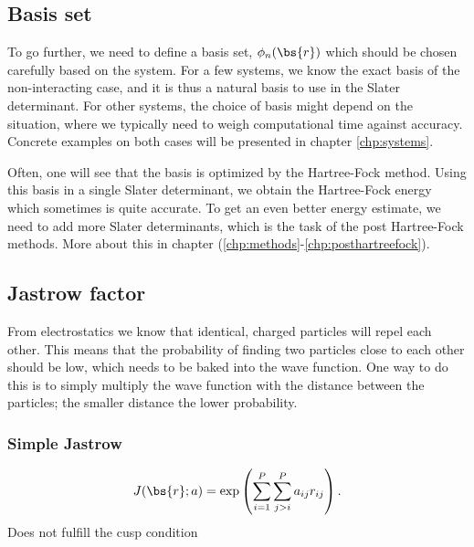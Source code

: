 \subsection{Basis set} \label{subsec:basisset}
To go further, we need to define a basis set, $\phi_n(\bs{r})$ which should be chosen carefully based on the system. For a few systems, we know the exact basis of the non-interacting case, and it is thus a natural basis to use in the Slater determinant. For other systems, the choice of basis might depend on the situation, where we typically need to weigh computational time against accuracy. Concrete examples on both cases will be presented in chapter \eqref{chp:systems}.

Often, one will see that the basis is optimized by the Hartree-Fock method. Using this basis in a single Slater determinant, we obtain the Hartree-Fock energy which sometimes is quite accurate. To get an even better energy estimate, we need to add more Slater determinants, which is the task of the post Hartree-Fock methods. More about this in chapter (\ref{chp:methods}-\ref{chp:posthartreefock}).

\subsection{Jastrow factor} \label{subsubsec:jastrow}
From electrostatics we know that identical, charged particles will repel each other. This means that the probability of finding two particles close to each other should be low, which needs to be baked into the wave function. One way to do this is to simply multiply the wave function with the distance between the particles; the smaller distance the lower probability. 

\subsubsection{Simple Jastrow}
\begin{equation}
J(\bs{r}; a) = \exp\left(\sum_{i=1}^P\sum_{j>i}^P{a_{ij}r_{ij}}\right).
\label{eq:SimpleJastrow}
\end{equation}
Does not fulfill the cusp condition

